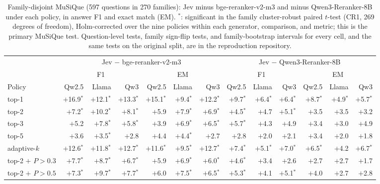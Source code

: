 \begin{table}[tp]
\centering
\scriptsize
\setlength{\tabcolsep}{2.6pt}
\caption{Family-disjoint MuSiQue (597 questions in 270 families): Jev minus bge-reranker-v2-m3 and minus Qwen3-Reranker-8B under each policy, in answer F1 and exact match (EM). $^\ast$: significant in the family cluster-robust paired $t$-test (CR1, 269 degrees of freedom), Holm-corrected over the nine policies within each generator, comparison, and metric; this is the primary MuSiQue test. Question-level tests, family sign-flip tests, and family-bootstrap intervals for every cell, and the same tests on the original split, are in the reproduction repository.}
\label{tab:rag-family}
\begin{tabular}{lrrrrrrrrrrrr}
\toprule
 & \multicolumn{6}{c}{Jev $-$ bge-reranker-v2-m3} & \multicolumn{6}{c}{Jev $-$ Qwen3-Reranker-8B} \\
\cmidrule(lr){2-7}\cmidrule(lr){8-13}
 & \multicolumn{3}{c}{F1} & \multicolumn{3}{c}{EM} & \multicolumn{3}{c}{F1} & \multicolumn{3}{c}{EM} \\
\cmidrule(lr){2-4}\cmidrule(lr){5-7}\cmidrule(lr){8-10}\cmidrule(lr){11-13}
Policy & Qw2.5 & Llama & Qw3 & Qw2.5 & Llama & Qw3 & Qw2.5 & Llama & Qw3 & Qw2.5 & Llama & Qw3 \\
\midrule
top-1 & $+$16.9$^\ast$ & $+$12.1$^\ast$ & $+$13.3$^\ast$ & $+$15.1$^\ast$ & $+$9.4$^\ast$ & $+$12.2$^\ast$ & $+$9.7$^\ast$ & $+$6.4$^\ast$ & $+$6.4$^\ast$ & $+$8.7$^\ast$ & $+$4.9$^\ast$ & $+$5.7$^\ast$ \\
top-2 & $+$7.2$^\ast$ & $+$10.2$^\ast$ & $+$8.1$^\ast$ & $+$5.9 & $+$7.9$^\ast$ & $+$6.9$^\ast$ & $+$4.5$^\ast$ & $+$4.7 & $+$5.1$^\ast$ & $+$3.5 & $+$3.5 & $+$3.2 \\
top-3 & $+$5.2 & $+$7.8$^\ast$ & $+$5.8$^\ast$ & $+$3.9 & $+$6.9$^\ast$ & $+$6.5$^\ast$ & $+$5.7$^\ast$ & $+$4.3 & $+$4.9 & $+$3.4 & $+$3.0 & $+$4.9 \\
top-5 & $+$3.6 & $+$3.5$^\ast$ & $+$2.8 & $+$4.4 & $+$4.4$^\ast$ & $+$2.7 & $+$2.8 & $+$2.0 & $+$2.1 & $+$3.4 & $+$2.0 & $+$1.8 \\
adaptive-$k$ & $+$12.6$^\ast$ & $+$11.8$^\ast$ & $+$12.7$^\ast$ & $+$11.6$^\ast$ & $+$9.5$^\ast$ & $+$12.7$^\ast$ & $+$7.4$^\ast$ & $+$5.1$^\ast$ & $+$7.0$^\ast$ & $+$6.5$^\ast$ & $+$4.2 & $+$6.7$^\ast$ \\
top-2 $+$ $P>0.3$ & $+$7.7$^\ast$ & $+$8.7$^\ast$ & $+$6.7$^\ast$ & $+$5.9 & $+$6.9$^\ast$ & $+$6.0$^\ast$ & $+$4.6$^\ast$ & $+$3.4 & $+$2.6 & $+$2.7 & $+$2.7 & $+$1.7 \\
top-2 $+$ $P>0.5$ & $+$7.3$^\ast$ & $+$9.7$^\ast$ & $+$7.7$^\ast$ & $+$6.0 & $+$7.5$^\ast$ & $+$6.5$^\ast$ & $+$5.3$^\ast$ & $+$4.1 & $+$5.1$^\ast$ & $+$4.0 & $+$2.7 & $+$2.8 \\

\end{tabular}
\end{table}
